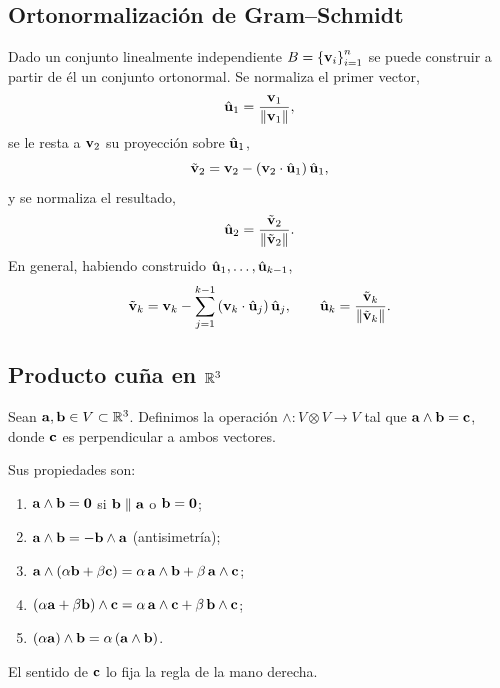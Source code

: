 \subsection{Ortonormalizaci\'on de Gram--Schmidt}
\label{subsec:gram_schmidt}

Dado un conjunto linealmente independiente
$B=\left\{ \mathbf{v}_i \right\}_{i=1}^{n}$ se puede construir a partir de \'el un conjunto
ortonormal. Se normaliza el primer vector,
\begin{equation}
  \label{eq:gs_primero}
  \hat{\mathbf{u}}_1=\frac{\mathbf{v}_1}{\lVert \mathbf{v}_1 \rVert},
\end{equation}
se le resta a $\mathbf{v}_2$ su proyecci\'on sobre $\hat{\mathbf{u}}_1$,
\begin{equation}
  \label{eq:gs_proyeccion}
  \tilde{\mathbf{v}}_2=\mathbf{v}_2-\left( \mathbf{v}_2\cdot\hat{\mathbf{u}}_1 \right)\hat{\mathbf{u}}_1,
\end{equation}
y se normaliza el resultado,
\begin{equation}
  \label{eq:gs_segundo}
  \hat{\mathbf{u}}_2=\frac{\tilde{\mathbf{v}}_2}{\lVert \tilde{\mathbf{v}}_2 \rVert} .
\end{equation}
En general, habiendo construido $\hat{\mathbf{u}}_1,\dots,\hat{\mathbf{u}}_{k-1}$,
\begin{equation}
  \label{eq:gs_general}
  \tilde{\mathbf{v}}_k=\mathbf{v}_k-\sum_{j=1}^{k-1}
    \left( \mathbf{v}_k\cdot\hat{\mathbf{u}}_j \right)\hat{\mathbf{u}}_j,
  \qquad
  \hat{\mathbf{u}}_k=\frac{\tilde{\mathbf{v}}_k}{\lVert \tilde{\mathbf{v}}_k \rVert} .
\end{equation}

\subsection{Producto cu\~na en $\mathbb{R}^3$}
\label{subsec:producto_cuna_3d}

\begin{definicion}[Producto cu\~na]
  \label{def:producto_cuna}
  Sean $\mathbf{a},\mathbf{b}\in V\subset\mathbb{R}^3$. Definimos la operaci\'on
  $\wedge:V\otimes V\rightarrow V$ tal que
  $\mathbf{a}\wedge\mathbf{b}=\mathbf{c}$, donde $\mathbf{c}$ es perpendicular a ambos
  vectores.
\end{definicion}

Sus propiedades son:
\begin{enumerate}
  \item $\mathbf{a}\wedge\mathbf{b}=\mathbf{0}$ si $\mathbf{b}\parallel\mathbf{a}$ o
        $\mathbf{b}=\mathbf{0}$;
  \item $\mathbf{a}\wedge\mathbf{b}=-\mathbf{b}\wedge\mathbf{a}$ (antisimetr\'ia);
  \item $\mathbf{a}\wedge(\alpha\mathbf{b}+\beta\mathbf{c})
         =\alpha\,\mathbf{a}\wedge\mathbf{b}+\beta\,\mathbf{a}\wedge\mathbf{c}$;
  \item $(\alpha\mathbf{a}+\beta\mathbf{b})\wedge\mathbf{c}
         =\alpha\,\mathbf{a}\wedge\mathbf{c}+\beta\,\mathbf{b}\wedge\mathbf{c}$;
  \item $(\alpha\mathbf{a})\wedge\mathbf{b}=\alpha\left( \mathbf{a}\wedge\mathbf{b} \right)$.
\end{enumerate}
El sentido de $\mathbf{c}$ lo fija la regla de la mano derecha.

